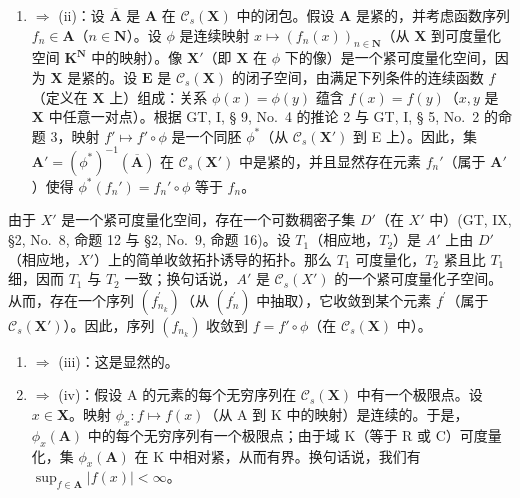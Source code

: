 \begin{enumerate}
\def\labelenumi{(\roman{enumi})}
\tightlist
\item
  \(\Rightarrow\) (ii)：设 \(\overline{\mathbf{A}}\) 是 \(\mathbf{A}\) 在 \(\mathcal{C}_s(\mathbf{X})\) 中的闭包。假设 \(\mathbf{A}\) 是紧的，并考虑函数序列 \(f_n \in \mathbf{A}\)（\(n \in \mathbf{N}\)）。设 \(\phi\) 是连续映射 \(x \mapsto (f_n(x))_{n \in \mathbf{N}}\)（从 \(\mathbf{X}\) 到可度量化空间 \(\mathbf{K}^{\mathbf{N}}\) 中的映射）。像 \(\mathbf{X}'\)（即 \(\mathbf{X}\) 在 \(\phi\) 下的像）是一个紧可度量化空间，因为 \(\mathbf{X}\) 是紧的。设 \(\mathbf{E}\) 是 \(\mathcal{C}_s(\mathbf{X})\) 的闭子空间，由满足下列条件的连续函数 \(f\)（定义在 \(\mathbf{X}\) 上）组成：关系 \(\phi(x) = \phi(y)\) 蕴含 \(f(x) = f(y)\)（\(x, y\) 是 \(\mathbf{X}\) 中任意一对点）。根据 GT, I, § 9, No.~4 的推论 2 与 GT, I, § 5, No.~2 的命题 3，映射 \(f' \mapsto f' \circ \phi\) 是一个同胚 \(\phi^*\)（从 \(\mathcal{C}_s(\mathbf{X}')\) 到 E 上）。因此，集 \(\mathbf{A}' = (\phi^*)^{-1}(\overline{\mathbf{A}})\) 在 \(\mathcal{C}_s(\mathbf{X}')\) 中是紧的，并且显然存在元素 \(f_n'\)（属于 \(\mathbf{A}'\)）使得 \(\phi^*(f_n') = f_n' \circ \phi\) 等于 \(f_n\)。
\end{enumerate}

由于 \(X'\) 是一个紧可度量化空间，存在一个可数稠密子集 \(D'\)（在 \(X'\) 中）(GT, IX, §2, No.~8, 命题 12 与 §2, No.~9, 命题 16)。设 \(T_{1}\)（相应地，\(T_{2}\)）是 \(A'\) 上由 \(D'\)（相应地，\(X'\)）上的简单收敛拓扑诱导的拓扑。那么 \(T_{1}\) 可度量化，\(T_{2}\) 紧且比 \(T_{1}\) 细，因而 \(T_{1}\) 与 \(T_{2}\) 一致；换句话说，\(A'\) 是 \(\mathcal{C}_{s}(X')\) 的一个紧可度量化子空间。从而，存在一个序列 \((f_{n_k}^{\prime})\)（从 \((f_n^{\prime})\) 中抽取），它收敛到某个元素 \(f^{\prime}\)（属于 \(\mathcal{C}_s(\mathbf{X}')\)）。因此，序列 \((f_{n_k})\) 收敛到 \(f = f' \circ \phi\)（在 \(\mathcal{C}_s(\mathbf{X})\) 中）。

\begin{enumerate}
\def\labelenumi{(\roman{enumi})}
\setcounter{enumi}{1}
\item
  \(\Rightarrow\) (iii)：这是显然的。
\item
  \(\Rightarrow\) (iv)：假设 A 的元素的每个无穷序列在 \(\mathcal{C}_s(\mathbf{X})\) 中有一个极限点。设 \(x \in \mathbf{X}\)。映射 \(\phi_x: f \mapsto f(x)\)（从 A 到 K 中的映射）是连续的。于是，\(\phi_x(\mathbf{A})\) 中的每个无穷序列有一个极限点；由于域 K（等于 R 或 C）可度量化，集 \(\phi_x(\mathbf{A})\) 在 K 中相对紧，从而有界。换句话说，我们有 \(\sup_{f \in \mathbf{A}} |f(x)| < \infty\)。
\end{enumerate}

